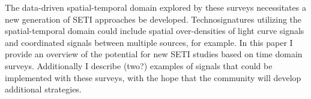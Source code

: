 \documentclass[modern]{aastex62}
\begin{document}
The data-driven spatial-temporal domain explored by these surveys necessitates a new generation of SETI approaches be developed. Technosignatures utilizing the spatial-temporal domain could include spatial over-densities of light curve signals and coordinated signals between multiple sources, for example.
In this paper I provide an overview of the potential for new SETI studies based on time domain surveys. %
Additionally I describe (two?) examples of signals that could be implemented with these surveys, with the hope that the community will develop additional strategies.





\end{document}
